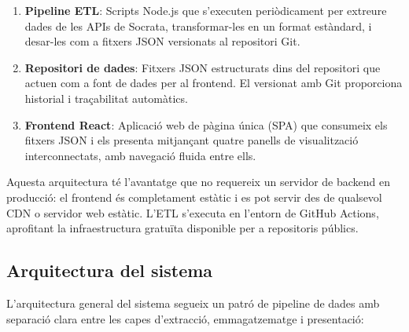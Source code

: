 \begin{enumerate}
    \item \textbf{Pipeline ETL}: Scripts Node.js que s'executen periòdicament per extreure dades de les APIs de Socrata, transformar-les en un format estàndard, i desar-les com a fitxers JSON versionats al repositori Git.
    
    \item \textbf{Repositori de dades}: Fitxers JSON estructurats dins del repositori que actuen com a font de dades per al frontend. El versionat amb Git proporciona historial i traçabilitat automàtics.
    
    \item \textbf{Frontend React}: Aplicació web de pàgina única (SPA) que consumeix els fitxers JSON i els presenta mitjançant quatre panells de visualització interconnectats, amb navegació fluida entre ells.
\end{enumerate}

Aquesta arquitectura té l'avantatge que no requereix un servidor de backend en producció: el frontend és completament estàtic i es pot servir des de qualsevol CDN o servidor web estàtic. L'ETL s'executa en l'entorn de GitHub Actions, aprofitant la infraestructura gratuïta disponible per a repositoris públics.


\subsection{Arquitectura del sistema}

L'arquitectura general del sistema segueix un patró de pipeline de dades amb separació clara entre les capes d'extracció, emmagatzematge i presentació:

